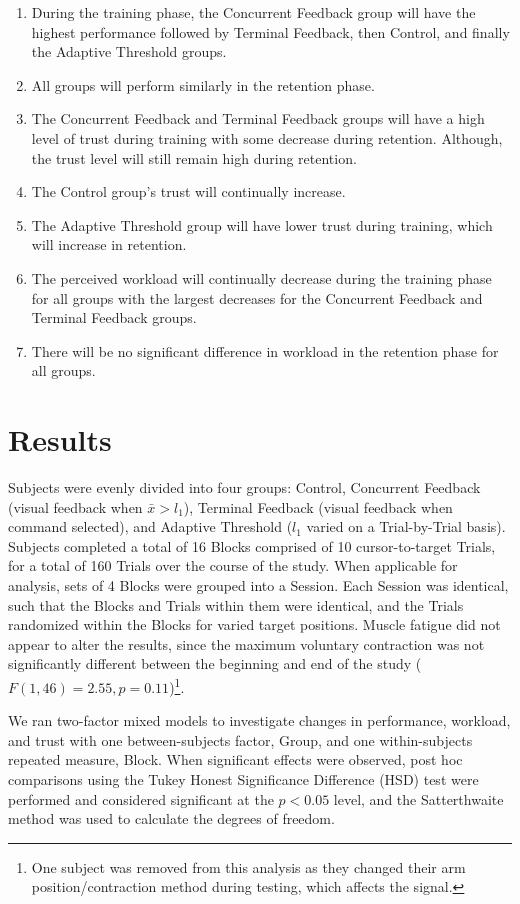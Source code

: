 \begin{enumerate}
	\item During the training phase, the Concurrent Feedback group will have the highest performance followed by Terminal Feedback, then Control, and finally the Adaptive Threshold groups.
	\item All groups will perform similarly in the retention phase.
	\item The Concurrent Feedback and Terminal Feedback groups will have a high level of trust during training with some decrease during retention.
	      Although, the trust level will still remain high during retention.
	\item The Control group's trust will continually increase.
	\item The Adaptive Threshold group will have lower trust during training, which will increase in retention.
	\item The perceived workload will continually decrease during the training phase for all groups with the largest decreases for the Concurrent Feedback and Terminal Feedback groups.
	\item There will be no significant difference in workload in the retention phase for all groups.
\end{enumerate}

\section{Results}
Subjects were evenly divided into four groups: Control, Concurrent Feedback (visual feedback when $\bar{x}> l_1$), Terminal Feedback (visual feedback when command selected), and Adaptive Threshold ($l_1$ varied on a Trial-by-Trial basis).
Subjects completed a total of 16 Blocks comprised of 10 cursor-to-target Trials, for a total of 160 Trials over the course of the study.
When applicable for analysis, sets of 4 Blocks were grouped into a Session.
Each Session was identical, such that the Blocks and Trials within them were identical, and the Trials randomized within the Blocks for varied target positions.
Muscle fatigue did not appear to alter the results, since the maximum voluntary contraction was not significantly different between the beginning and end of the study ($F(1, 46) = 2.55, p = 0.11$)\footnote{One subject was removed from this analysis as they changed their arm position/contraction method during testing, which affects the signal.}.

We ran two-factor mixed models to investigate changes in performance, workload, and trust with one between-subjects factor, Group, and one within-subjects repeated measure, Block.
When significant effects were observed, post hoc comparisons using the Tukey Honest Significance Difference (HSD) test were performed and considered significant at the $p < 0.05$ level, and the Satterthwaite method was used to calculate the degrees of freedom.

